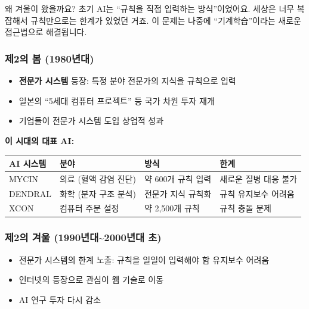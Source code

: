 \documentclass[11pt,a4paper]{article}
\renewcommand{\arraystretch}{1.4}
\begin{document}
왜 겨울이 왔을까요? 초기 AI는 ``규칙을 직접 입력하는 방식''이었어요. 세상은 너무 복잡해서 규칙만으로는 한계가 있었던 거죠. 이 문제는 나중에 ``기계학습''이라는 새로운 접근법으로 해결됩니다.

\newpage

\subsubsection{ 제2의 봄 (1980년대)}

\begin{itemize}[leftmargin=*]
    \item \textbf{전문가 시스템} 등장: 특정 분야 전문가의 지식을 규칙으로 입력
    \item 일본의 ``5세대 컴퓨터 프로젝트'' 등 국가 차원 투자 재개
    \item 기업들이 전문가 시스템 도입  상업적 성과
\end{itemize}

\textbf{이 시대의 대표 AI:}

\begin{center}
\renewcommand{\arraystretch}{1.4}
\begin{tabular}{|l|l|p{3.5cm}|p{3.5cm}|}
\hline
\rowcolor{tableheader}
\textbf{AI 시스템} & \textbf{분야} & \textbf{방식} & \textbf{한계} \\
\hline
MYCIN & 의료 (혈액 감염 진단) & 약 600개 규칙 입력 & 새로운 질병 대응 불가 \\
\hline
DENDRAL & 화학 (분자 구조 분석) & 전문가 지식 규칙화 & 규칙 유지보수 어려움 \\
\hline
XCON & 컴퓨터 주문 설정 & 약 2,500개 규칙 & 규칙 충돌 문제 \\
\hline
\end{tabular}
\end{center}

\subsubsection{ 제2의 겨울 (1990년대\textasciitilde 2000년대 초)}

\begin{itemize}[leftmargin=*]
    \item 전문가 시스템의 한계 노출: 규칙을 일일이 입력해야 함  유지보수 어려움
    \item 인터넷의 등장으로 관심이 웹 기술로 이동
    \item AI 연구 투자 다시 감소
\end{itemize}
\end{document}
